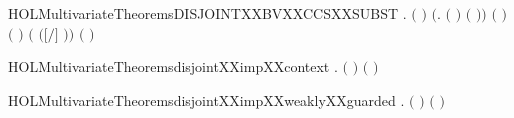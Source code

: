 \newcommand{\HOLMultivariateTheoremscontextXXvar}{\UseVerbatim{HOLMultivariateTheoremscontextXXvar}}
\begin{SaveVerbatim}{HOLMultivariateTheoremsDISJOINTXXBVXXCCSXXSUBST}
\HOLTokenTurnstile{} \HOLSymConst{\HOLTokenForall{}}  .
         \HOLSymConst{\HOLTokenConj{}} \ensuremath{(}  \HOLSymConst{\ensuremath{=}}  \ensuremath{)} \HOLSymConst{\HOLTokenConj{}}
        \ensuremath{(}\HOLTokenLambda{}.  \ensuremath{(} \ensuremath{)} \ensuremath{(} \ensuremath{)}\ensuremath{)}  \HOLSymConst{\HOLTokenConj{}}
        \ensuremath{(} \ensuremath{)} \ensuremath{(} \ensuremath{)} \HOLSymConst{\HOLTokenImp{}}
        \ensuremath{(} \ensuremath{(}\ensuremath{[}\ensuremath{/}\ensuremath{]} \ensuremath{)}\ensuremath{)} \ensuremath{(} \ensuremath{)}
\end{SaveVerbatim}
\newcommand{\HOLMultivariateTheoremsDISJOINTXXBVXXCCSXXSUBST}{\UseVerbatim{HOLMultivariateTheoremsDISJOINTXXBVXXCCSXXSUBST}}
\begin{SaveVerbatim}{HOLMultivariateTheoremsdisjointXXimpXXcontext}
\HOLTokenTurnstile{} \HOLSymConst{\HOLTokenForall{}} .  \ensuremath{(} \ensuremath{)} \ensuremath{(} \ensuremath{)} \HOLSymConst{\HOLTokenImp{}}   
\end{SaveVerbatim}
\newcommand{\HOLMultivariateTheoremsdisjointXXimpXXcontext}{\UseVerbatim{HOLMultivariateTheoremsdisjointXXimpXXcontext}}
\begin{SaveVerbatim}{HOLMultivariateTheoremsdisjointXXimpXXweaklyXXguarded}
\HOLTokenTurnstile{} \HOLSymConst{\HOLTokenForall{}} .  \ensuremath{(} \ensuremath{)} \ensuremath{(} \ensuremath{)} \HOLSymConst{\HOLTokenImp{}}   
\end{SaveVerbatim}
\newcommand{\HOLMultivariateTheoremsdisjointXXimpXXweaklyXXguarded}{\UseVerbatim{HOLMultivariateTheoremsdisjointXXimpXXweaklyXXguarded}}
